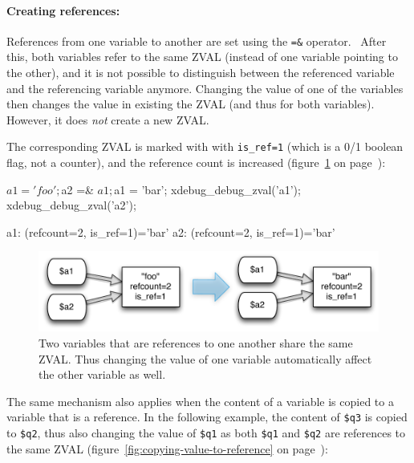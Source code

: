 \paragraph{Creating references:}

References from one variable to another are set using the \texttt{=\&} operator.~\cite[page 129]{wenz-php53}\cite{php-manual-what-references-do} After this, both variables refer to the same ZVAL (instead of one variable pointing to the other), and it is not possible to distinguish between the referenced variable and the referencing variable anymore. Changing the value of one of the variables then changes the value in existing the ZVAL (and thus for both variables). However, it does \emph{not} create a new ZVAL.

The corresponding ZVAL is marked with with \texttt{is\_ref=1} (which is a 0/1 boolean flag, not a counter), and the reference count is increased (figure~\ref{fig:simple-reference} on page~\pageref{fig:simple-reference}):

\begin{phpcode}
$a1 = 'foo';
$a2 =& $a1;
$a1 = 'bar';
xdebug_debug_zval('a1');
xdebug_debug_zval('a2');
\end{phpcode}

\begin{textcode}
a1: (refcount=2, is_ref=1)='bar'
a2: (refcount=2, is_ref=1)='bar'
\end{textcode}

\begin{figure}[!h]
  \begin{center}
    \includegraphics[scale=0.8]{images/a1_a2}
    \caption{Two variables that are references to one another share the same ZVAL. Thus changing the value of one variable automatically affect the other variable as well.}
    \label{fig:simple-reference}
  \end{center}
\end{figure}


The same mechanism also applies when the content of a variable is copied to a variable that is a reference. In the following example, the content of \texttt{\$q3} is copied to \texttt{\$q2}, thus also changing the value of \texttt{\$q1} as both \texttt{\$q1} and \texttt{\$q2} are references to the same ZVAL (figure~\ref{fig:copying-value-to-reference} on page~\pageref{fig:copying-value-to-reference}):

